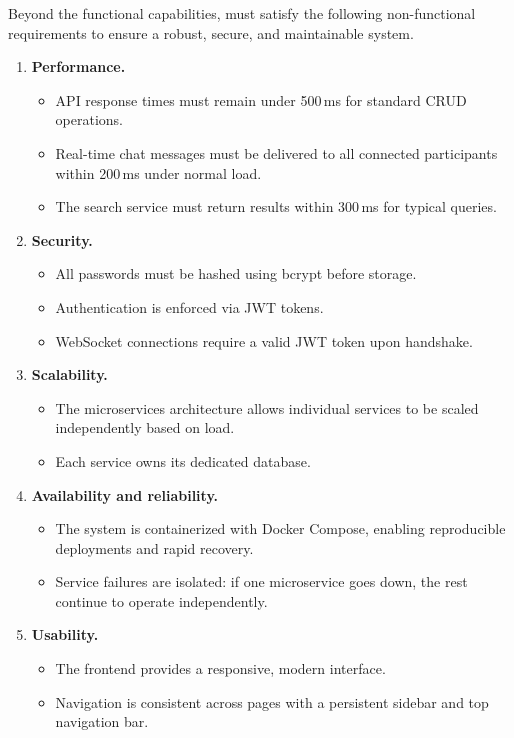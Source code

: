 Beyond the functional capabilities, \eduspace{} must satisfy the following non-functional requirements to ensure a robust, secure, and maintainable system.

\begin{enumerate}[label=\textbf{NFR-\arabic*.}, leftmargin=2.8cm]
  \item \textbf{Performance.}
        \begin{itemize}[nosep]
          \item API response times must remain under 500\,ms for standard CRUD operations.
          \item Real-time chat messages must be delivered to all connected participants within 200\,ms under normal load.
          \item The search service must return results within 300\,ms for typical queries.
        \end{itemize}

  \item \textbf{Security.}
        \begin{itemize}[nosep]
          \item All passwords must be hashed using bcrypt before storage.
          \item Authentication is enforced via JWT tokens.
          \item WebSocket connections require a valid JWT token upon handshake.
        \end{itemize}

  \item \textbf{Scalability.}
        \begin{itemize}[nosep]
          \item The microservices architecture allows individual services to be scaled independently based on load.
          \item Each service owns its dedicated database.
        \end{itemize}

  \item \textbf{Availability and reliability.}
        \begin{itemize}[nosep]
          \item The system is containerized with Docker Compose, enabling reproducible deployments and rapid recovery.
          \item Service failures are isolated: if one microservice goes down, the rest continue to operate independently.
        \end{itemize}

  \item \textbf{Usability.}
        \begin{itemize}[nosep]
          \item The frontend provides a responsive, modern interface.
          \item Navigation is consistent across pages with a persistent sidebar and top navigation bar.
        \end{itemize}
\end{enumerate}

